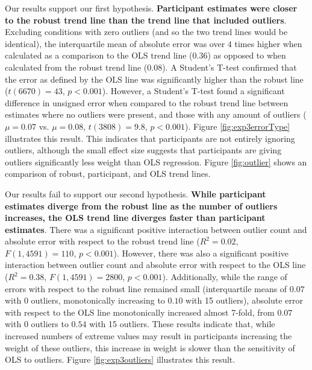 \documentclass{sigchi}
\begin{document}
\expThreeOutliersFig

Our results support our first hypothesis. \textbf{Participant estimates were closer to the robust trend line than the trend line that included outliers}. Excluding conditions with zero outliers (and so the two trend lines would be identical), the interquartile mean of absolute error was over $4$ times higher when calculated as a comparison to the OLS trend line ($0.36$) as opposed to when calculated from the robust trend line ($0.08$). A Student's T-test confirmed that the error as defined by the OLS line was significantly higher than the robust line ($t(6670)= 43$, $p<0.001$). However, a Student's T-test found a significant difference in unsigned error when compared to the robust trend line between estimates where no outliers were present, and those with any amount of outliers ($\mu=0.07$ vs. $\mu=0.08$, $t(3808) = 9.8$, $p<0.001$). Figure \ref{fig:exp3errorType} illustrates this result. This indicates that participants are not entirely ignoring outliers, although the small effect size suggests that participants are giving outliers significantly less weight than OLS regression. Figure \ref{fig:outlier} shows an comparison of robust, participant, and OLS trend lines.


Our results fail to support our second hypothesis. \textbf{While participant estimates diverge from the robust line as the number of outliers increases, the OLS trend line diverges faster than participant estimates}. There was a significant positive interaction between outlier count and absolute error with respect to the robust trend line ($R^2 = 0.02$, $F(1,4591)=110$, $p<0.001$). However, there was also a significant positive interaction between outlier count and absolute error with respect to the OLS line  ($R^2 = 0.38$, $F(1,4591)=2800$, $p<0.001$). Additionally, while the range of errors with respect to the robust line remained small (interquartile means of $0.07$ with 0 outliers, monotonically increasing to $0.10$ with 15 outliers), absolute error with respect to the OLS line monotonically increased almost 7-fold, from $0.07$ with 0 outliers to $0.54$ with 15 outliers. These results indicate that, while increased numbers of extreme values may result in participants increasing the weight of these outliers, this increase in weight is slower than the sensitivity of OLS to outliers.  Figure \ref{fig:exp3outliers} illustrates this result.
\end{document}
